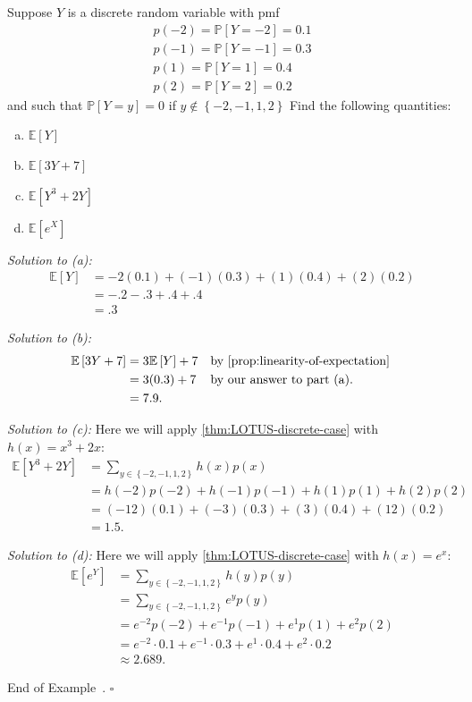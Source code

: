 \documentclass[10pt]{article}
\theoremstyle{definition}
\newtheorem{example}[theorem]{Example}
\renewenvironment{example}
{\begin{oldexample}}
  {\par\smallskip\hfill   End of Example~\theexample. $\square$    \par\end{oldexample}}
\newcommand{\1}[1]{\textbf{1}_{\left[#1\right]}} %
\def\E{\mathbb{E}} %
\def\P{\mathbb{P}} %
\begin{document}
\begin{example}
  Suppose $Y$ is a discrete random variable with pmf
  \begin{gather*}
    p(-2) = \P\left[Y = -2 \right] = 0.1 \\ p(-1) = \P\left[Y=-1 \right] = 0.3 \\ p(1) = \P\left[Y=1 \right] =0.4 \\  p(2) = \P\left[Y=2 \right] = 0.2
  \end{gather*}
  and such that $\P\left[Y=y \right] = 0$ if $y\notin \left\{-2,-1,1,2\right\}$
  Find the following quantities:
  \begin{enumerate}[(a)]
    \item $\E\left[Y \right]$
    \item $\E\left[3Y+7 \right]$
    \item $\E\left[Y^{3}+2Y \right]$
    \item $\E\left[e^{X} \right]$
  \end{enumerate}

  \textit{Solution to (a):}
  \begin{align*}
    \E\left[Y \right] 
    &= -2(0.1)+(-1)(0.3)+(1)(0.4)+(2)(0.2)\\
    &= -.2 -.3 +.4 + .4\\
    &= .3
  \end{align*}

  \textit{Solution to (b):}
  \begin{align*}
    \E\left[3Y+7 \right] 
    &= 3 \E\left[Y \right]+7
    &&\text{by \cref{prop:linearity-of-expectation} }\\
    &= 3(0.3)+7
    &&\text{by our answer to part (a). }\\
    &= 7.9.
  \end{align*}

  \textit{Solution to (c):} Here we will apply  \cref{thm:LOTUS-discrete-case} with $h(x)=x^{3}+2x$:
  \begin{align*}
    \E\left[Y^{3}+2Y \right] 
    &= \sum_{y\in \left\{-2,-1,1,2\right\}} h(x)p(x)\\
    &= h(-2)p(-2)+h(-1)p(-1)+h(1)p(1)+h(2)p(2)\\
    &= (-12)(0.1)+(-3)(0.3)+(3)(0.4)+(12)(0.2)\\
    &= 1.5.
  \end{align*}

  \textit{Solution to (d):} Here we will apply \cref{thm:LOTUS-discrete-case} with $h(x) =
  e^{x}$:
  \begin{align*}
    \E\left[e^{Y} \right] 
    &= \sum_{y\in \left\{-2,-1,1,2\right\}} h(y)p(y)\\
    &= \sum_{y\in \left\{-2,-1,1,2\right\}} e^{y}p(y)\\
    &= e^{-2}p(-2)+ e^{-1}p(-1)+e^{1}p(1)+e^{2}p(2)\\
    &= e^{-2}\cdot0.1+ e^{-1}\cdot0.3+e^{1}\cdot0.4+e^{2}\cdot0.2\\
    &\approx 2.689.
  \end{align*}
\end{example}
\end{document}
